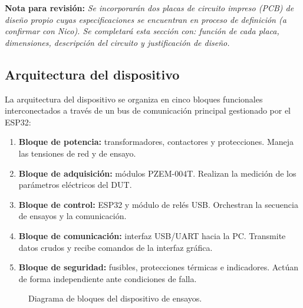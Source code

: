\noindent\textbf{Nota para revisión:} \textit{Se incorporarán dos placas de
circuito impreso (PCB) de diseño propio cuyas especificaciones
se encuentran en proceso de definición (a confirmar con Nico).
Se completará esta sección con: función de cada placa,
dimensiones, descripción del circuito y justificación de diseño.}

\subsection{Arquitectura del dispositivo}
\label{subsec:arquitectura_hw}

La arquitectura del dispositivo se organiza en cinco bloques funcionales
interconectados a través de un bus de comunicación principal
gestionado por el ESP32:

\begin{enumerate}
    \item \textbf{Bloque de potencia:} transformadores, contactores y
          protecciones. Maneja las tensiones de red y de ensayo.
    \item \textbf{Bloque de adquisición:} módulos PZEM-004T. Realizan
          la medición de los parámetros eléctricos del DUT.
    \item \textbf{Bloque de control:} ESP32 y módulo de relés USB.
          Orchestran la secuencia de ensayos y la comunicación.
    \item \textbf{Bloque de comunicación:} interfaz USB/UART hacia la PC.
          Transmite datos crudos y recibe comandos de la interfaz gráfica.
    \item \textbf{Bloque de seguridad:} fusibles, protecciones térmicas
          e indicadores. Actúan de forma independiente ante condiciones
          de falla.
\end{enumerate}

\begin{figure}[H]
    \centering
    \caption{Diagrama de bloques del dispositivo de ensayos.}
    \label{fig:diagrama_bloques_hw}
\end{figure}

